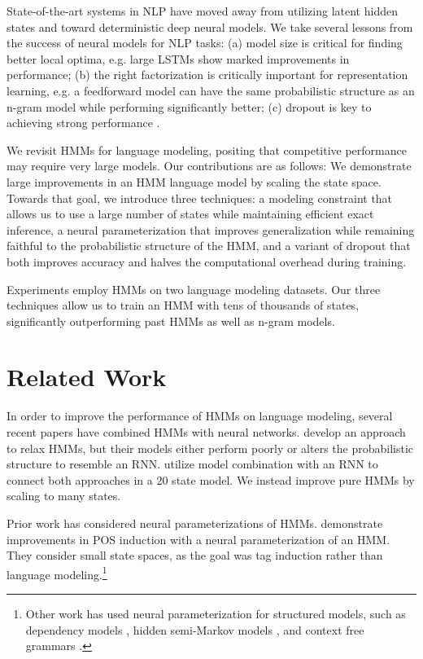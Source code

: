 \documentclass[11pt,a4paper]{article}
\begin{document}
State-of-the-art systems in NLP have moved away from utilizing latent hidden states
and toward deterministic deep neural models.
We take several lessons from the success of neural models for NLP tasks:
(a) model size is critical for finding better local optima,
e.g. large LSTMs \cite{zaremba2014lstm} show marked improvements in performance;
(b) the right factorization is critically important for representation learning,
e.g. a feedforward model \cite{bengio2003nlm}
can have the same probabilistic structure as an n-gram model while performing significantly better;
(c) dropout is key to achieving strong performance \citep{zaremba2014lstm,merity2017awdlstm}.

We revisit HMMs for language modeling,
positing that competitive performance may require very large models. 
Our contributions are as follows:
We demonstrate large improvements in an HMM language model by scaling the state space.
Towards that goal, we introduce three techniques:
a modeling constraint that allows us to use a large number of states 
while maintaining efficient exact inference,
a neural parameterization that improves
generalization while remaining faithful to the
probabilistic structure of the HMM,
and a variant of dropout that both improves accuracy
and halves the computational overhead during training. 

Experiments employ HMMs on two language modeling datasets.
Our three techniques allow us to train an HMM with tens of thousands of states,
significantly outperforming past HMMs as well as n-gram models.

\section{Related Work}
\label{sec:rw}
In order to improve the performance of HMMs on language modeling,
several recent papers have combined HMMs with neural networks.
\citet{buys2018hmm} develop an approach to relax HMMs,
but their models either perform poorly or alters the probabilistic structure to resemble an RNN. 
\citet{krakovna2016hmm} utilize model combination with an RNN to connect both approaches in a
20 state model.
We instead improve pure HMMs by scaling to many states.

Prior work has considered neural parameterizations of HMMs. 
\citet{tran2016hmm} demonstrate improvements in POS induction with a
neural parameterization of an HMM.
They consider small state spaces,
as the goal was tag induction rather than language modeling.\footnote{
Other work has used neural parameterization for structured models, such as 
dependency models \citep{han2017dependency},
hidden semi-Markov models \citep{wiseman2018hsmm},
and context free grammars \citep{kim2019cpcfg}.
}
\end{document}
